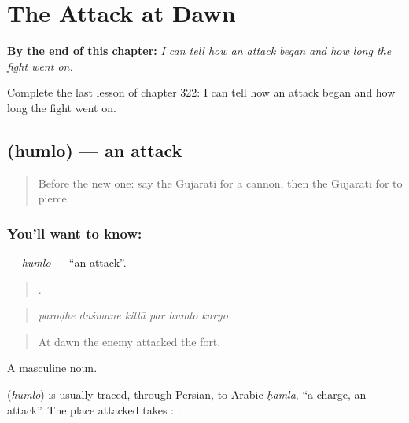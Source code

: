 
\chapter{The Attack at Dawn}
\label{ch:gu-the-attack-at-dawn}

\begin{chapteropening}
\textbf{By the end of this chapter:} \emph{I can tell how an attack began and how long the fight went on.}

Complete the last lesson of chapter 322: I can tell how an attack began and how long the fight went on.
\end{chapteropening}

\section[\texorpdfstring{\gu{હુમલો} (humlo)}{હુમલો (humlo)}]{ (humlo) — an attack}

\label{lesson:GU-C322-humlo}



\begin{quote}
Before the new one: say the Gujarati for a cannon, then the Gujarati for to pierce.
\end{quote}

\subsection*{You'll want to know: }
\textbf{} — \emph{humlo} — \textquotedblleft{}an attack\textquotedblright{}.

\begin{quote}
     .
\end{quote}

\begin{quote}
\emph{paroḍhe duśmane killā par humlo karyo.}
\end{quote}

\begin{quote}
At dawn the enemy attacked the fort.
\end{quote}

A masculine noun.

\begin{cousinweb}
\textbf{} (\emph{humlo}) is usually traced, through Persian, to Arabic \emph{ḥamla}, \textquotedblleft{}a charge, an attack\textquotedblright{}. The place attacked takes \textbf{}: \textbf{  }.
\end{cousinweb}

